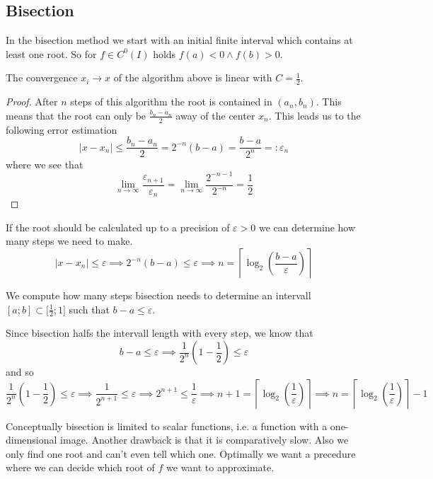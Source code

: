 \subsection{Bisection}
In the bisection method we start with an initial finite interval which contains at least one root.
So for \(f \in C^0(I)\) holds \(f(a) < 0 \land f(b) > 0\).

\begin{proposition}
   The convergence \(x_i \to x\) of the algorithm above is linear with \(C = \frac{1}{2}\).
\end{proposition}
\begin{proof}
   After \(n\) steps of this algorithm the root is contained in \((a_n, b_n)\).
   This means that the root can only be \(\frac{b_n - a_n}{2}\) away of the center \(x_n\).
   This leads us to the following error estimation
   \[|x - x_n| \leq \frac{b_n - a_n}{2} = 2^{-n}(b - a) = \frac{b-a}{2^n} =:\varepsilon_n\]
   where we see that
   \[\lim_{n \to \infty} \frac{\varepsilon_{n+1}}{\varepsilon_n} = \lim_{n \to \infty} \frac{2^{-n-1}}{2^{-n}} = \frac{1}{2}\]
\end{proof}
\begin{remark}
   If the root should be calculated up to a precision of \(\varepsilon > 0\) we can determine how many steps we need to make.
   \[|x - x_n| \leq \varepsilon \implies 2^{-n} (b-a) \leq \varepsilon \implies n = \left\lceil \log_2\left(\frac{b-a}{\varepsilon}\right)\right\rceil\]
\end{remark}



\begin{example}
   We compute how many steps bisection needs to determine an intervall \([a; b] \subset \big[\frac{1}{2}; 1\big]\) such that \(b - a \leq \varepsilon\).

   Since bisection halfs the intervall length with every step, we know that
   \[b - a \leq \varepsilon \implies \frac{1}{2^n}\left(1 - \frac{1}{2}\right) \leq \varepsilon\]
   and so
   \[\frac{1}{2^n}\left(1 - \frac{1}{2}\right) \leq \varepsilon \implies \frac{1}{2^{n+1}} \leq \varepsilon \implies 2^{n+1} \leq \frac{1}{\varepsilon} \implies n+1 = \left\lceil \log_2\left(\frac{1}{\varepsilon}\right)\right\rceil \implies n = \left\lceil \log_2\left(\frac{1}{\varepsilon}\right)\right\rceil - 1\]
\end{example}

Conceptually bisection is limited to scalar functions, i.e. a function with a one-dimensional image.
Another drawback is that it is comparatively slow.
Also we only find one root and can't even tell which one.
Optimally we want a precedure where we can decide which root of \(f\) we want to approximate.

